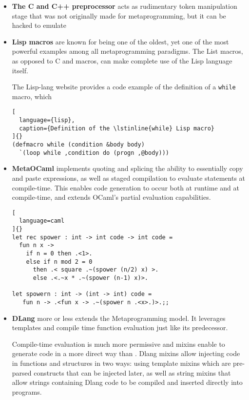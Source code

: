 \documentclass[../main]{subfiles}
\begin{document}
\begin{itemize}
\item
\textbf{The C and C++ preprocessor} acts as rudimentary token manipulation stage
that was not originally made for metaprogramming, but it can be hacked
to emulate

\item
\textbf{Lisp macros}
are known for being one of the oldest, yet one of the most powerful
examples among all metaprogramming paradigms. The List macros, as opposed to
C and \cpp macros, can make complete use of the Lisp language itself.

The Lisp-lang \cite{lisp-lang-macros} website provides a code example of
the definition of a \lstinline{while} macro, which

\begin{lstlisting}[
  language={lisp},
  caption={Definition of the \lstinline{while} Lisp macro}
]{}
(defmacro while (condition &body body)
  `(loop while ,condition do (progn ,@body)))
\end{lstlisting}


\item
\textbf{MetaOCaml} \cite{metaocaml} implements quoting and splicing
\ie the ability to essentially copy and paste expressions,
as well as staged compilation to evaluate statements at compile-time.
This enables code generation to occur both at runtime and at compile-time,
and extends OCaml's partial evaluation capabilities.


\begin{lstlisting}[
  language=caml
]{}
let rec spower : int -> int code -> int code =
  fun n x ->
    if n = 0 then .<1>.
    else if n mod 2 = 0
      then .< square .~(spower (n/2) x) >.
      else .<.~x * .~(spower (n-1) x)>.

let spowern : int -> (int -> int) code =
   fun n -> .<fun x -> .~(spower n .<x>.)>.;;
\end{lstlisting}

\item
\textbf{DLang} more or less extends the \cpp Metaprogramming model.
It leverages templates and compile time function evaluation just like
its predecessor.

Compile-time evaluation is much more permissive and mixins enable to generate
code in a more direct way than \cpp. Dlang mixins allow injecting code in
functions and structures in two ways: using template mixins
which are pre-parsed constructs that can be injected later,
as well as string mixins that allow strings containing Dlang code
to be compiled and inserted directly into programs.


\end{itemize}
\end{document}

